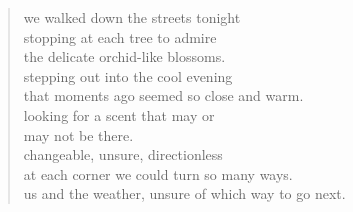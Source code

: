 
\begin{verse}
we walked down the streets tonight \\ 
stopping at each tree to admire \\
the delicate orchid-like blossoms. \\
stepping out into the cool evening \\
that moments ago seemed so close and warm. \\
looking for a scent that may or \\
may not be there. \\
changeable, unsure, directionless \\
at each corner we could turn so many ways. \\
us and the weather, unsure of which way to go next.
\end{verse}
